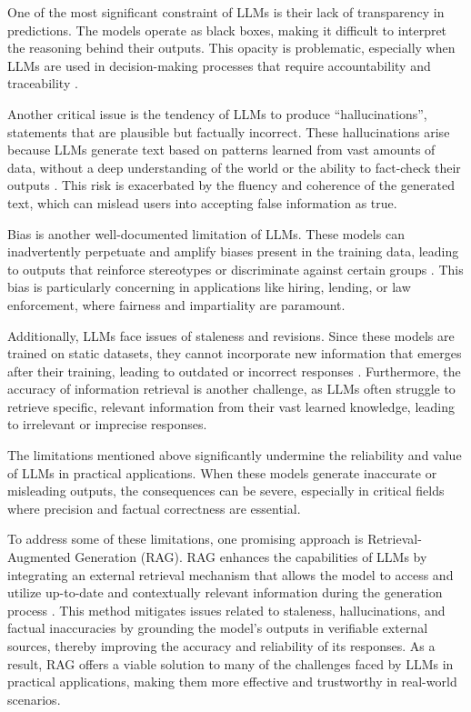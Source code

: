 One of the most significant constraint of LLMs is their lack of transparency in predictions. The models operate as black boxes, making it difficult to interpret the reasoning behind their outputs. This opacity is problematic, especially when LLMs are used in decision-making processes that require accountability and traceability \cite{rudin2019stop}.

Another critical issue is the tendency of LLMs to produce “hallucinations”, statements that are plausible but factually incorrect. These hallucinations arise because LLMs generate text based on patterns learned from vast amounts of data, without a deep understanding of the world or the ability to fact-check their outputs \cite{maynez2020faithfulness}. This risk is exacerbated by the fluency and coherence of the generated text, which can mislead users into accepting false information as true.

Bias is another well-documented limitation of LLMs. These models can inadvertently perpetuate and amplify biases present in the training data, leading to outputs that reinforce stereotypes or discriminate against certain groups \cite{bender2021dangers}. This bias is particularly concerning in applications like hiring, lending, or law enforcement, where fairness and impartiality are paramount.

Additionally, LLMs face issues of staleness and revisions. Since these models are trained on static datasets, they cannot incorporate new information that emerges after their training, leading to outdated or incorrect responses \cite{dhingra2022time}. Furthermore, the accuracy of information retrieval is another challenge, as LLMs often struggle to retrieve specific, relevant information from their vast learned knowledge, leading to irrelevant or imprecise responses.

The limitations mentioned above significantly undermine the reliability and value of LLMs in practical applications. When these models generate inaccurate or misleading outputs, the consequences can be severe, especially in critical fields where precision and factual correctness are essential.

To address some of these limitations, one promising approach is Retrieval-Augmented Generation (RAG). RAG enhances the capabilities of LLMs by integrating an external retrieval mechanism that allows the model to access and utilize up-to-date and contextually relevant information during the generation process \cite{lewis2020retrieval}. This method mitigates issues related to staleness, hallucinations, and factual inaccuracies by grounding the model’s outputs in verifiable external sources, thereby improving the accuracy and reliability of its responses. As a result, RAG offers a viable solution to many of the challenges faced by LLMs in practical applications, making them more effective and trustworthy in real-world scenarios.


